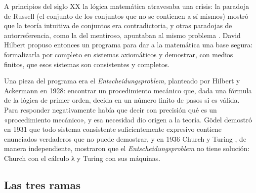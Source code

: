 A principios del siglo XX la lógica matemática atravesaba una crisis: la paradoja de Russell (el conjunto de los conjuntos que no se contienen a sí mismos) mostró que la teoría intuitiva de conjuntos era contradictoria, y otras paradojas de autorreferencia, como la del mentiroso, apuntaban al mismo problema \autocite[cap. 3]{kleene1952}. David Hilbert propuso entonces un programa para dar a la matemática una base segura: formalizarla por completo en sistemas axiomáticos y demostrar, con medios finitos, que esos sistemas son consistentes y completos.

Una pieza del programa era el \emph{Entscheidungsproblem}, planteado por Hilbert y Ackermann en 1928: encontrar un procedimiento mecánico que, dada una fórmula de la lógica de primer orden, decida en un número finito de pasos si es válida. Para responder negativamente había que decir con precisión qué es un «procedimiento mecánico», y esa necesidad dio origen a la teoría. Gödel demostró en 1931 que todo sistema consistente suficientemente expresivo contiene enunciados verdaderos que no puede demostrar, y en 1936 Church \autocite*{church1936} y Turing \autocite*{turing1936}, de manera independiente, mostraron que el \emph{Entscheidungsproblem} no tiene solución: Church con el cálculo λ y Turing con sus máquinas.

\hypertarget{las-tres-ramas}{%
\subsection{Las tres ramas}\label{las-tres-ramas}}

